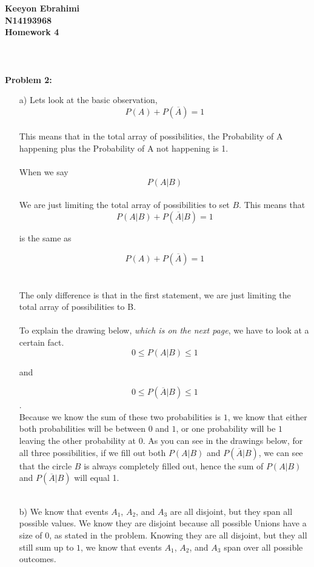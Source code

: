 \documentclass[11pt]{article}
\begin{document}
\textbf{Keeyon Ebrahimi}\\
\textbf{N14193968}\\
\textbf{Homework 4}\\
\\ \\ \\
\textbf{Problem 2:}\\
\begin{enumerate}
\item[a) ] Lets look at the basic observation, $$P(A) + P(\overline{A}) = 1$$\\
This means that in the total array of possibilities, the Probability of A happening plus the Probability of A not happening is 1.\\ \\
When we say $$P(A|B)$$ \\ We are just limiting the total array of possibilities to set $B$.
This means that $$P(A|B) + P(\overline{A}|B) = 1$$
\begin{center}
 is the same as 
\end{center}
$$P(A) + P(\overline{A}) = 1$$ \\ \\
The only difference is that in the first statement, we are just limiting the total array of possibilities to B. \\ \\
To explain the drawing below, \textit{which is on the next page}, we have to look at a certain fact.
$$0 \leq P(A|B) \leq 1$$ 
\begin{center}
and 
\end{center}
$$0 \leq P(\overline{A}|B) \leq 1$$.
\\ Because we know the sum of these two probabilities is $1$, we know that either both probabilities will be between $0$ and $1$, or one probability will be $1$ leaving the other probability at $0$.  As you can see in the drawings below, for all three possibilities, if we fill out both $P(A|B)$ and $P(\overline{A}|B)$, we can see that the circle $B$ is always completely filled out, hence the sum of $P(A|B)$ and $P(\overline{A}|B)$ will equal 1.\\ \\ 
\newpage
\item[b) ]  We know that events $A_1$, $A_2$, and $A_3$ are all disjoint, but they span all possible values.  We know they are disjoint because all possible Unions have a size of $0$, as stated in the problem.  Knowing they are all disjoint, but they all still sum up to $1$, we know that events $A_1$, $A_2$, and $A_3$ span over all possible outcomes.\\ \\

\end{enumerate}
\end{document}
